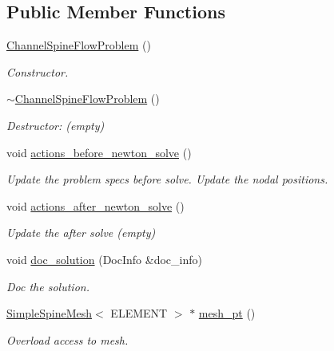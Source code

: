 \subsection*{Public Member Functions}
\begin{DoxyCompactItemize}
\item 
\hyperlink{classChannelSpineFlowProblem_a23f1b987e3395b1d101eaf3f3b5c94b2}{Channel\+Spine\+Flow\+Problem} ()
\begin{DoxyCompactList}\small\item\em Constructor. \end{DoxyCompactList}\item 
\hyperlink{classChannelSpineFlowProblem_abdf2cc520915167d8718499459df348b}{$\sim$\+Channel\+Spine\+Flow\+Problem} ()
\begin{DoxyCompactList}\small\item\em Destructor\+: (empty) \end{DoxyCompactList}\item 
void \hyperlink{classChannelSpineFlowProblem_aaf6dd8a8a472ccd938df579aba61ec97}{actions\+\_\+before\+\_\+newton\+\_\+solve} ()
\begin{DoxyCompactList}\small\item\em Update the problem specs before solve. Update the nodal positions. \end{DoxyCompactList}\item 
void \hyperlink{classChannelSpineFlowProblem_a419a80ef3d19438f193bd7843f72446a}{actions\+\_\+after\+\_\+newton\+\_\+solve} ()
\begin{DoxyCompactList}\small\item\em Update the after solve (empty) \end{DoxyCompactList}\item 
void \hyperlink{classChannelSpineFlowProblem_a101bdeee56502231945cbac272ca21f6}{doc\+\_\+solution} (Doc\+Info \&doc\+\_\+info)
\begin{DoxyCompactList}\small\item\em Doc the solution. \end{DoxyCompactList}\item 
\hyperlink{classSimpleSpineMesh}{Simple\+Spine\+Mesh}$<$ E\+L\+E\+M\+E\+NT $>$ $\ast$ \hyperlink{classChannelSpineFlowProblem_ab68c7ab5406b90a0ef56c39b67f83a09}{mesh\+\_\+pt} ()
\begin{DoxyCompactList}\small\item\em Overload access to mesh. \end{DoxyCompactList}\item 

\end{DoxyCompactItemize}
